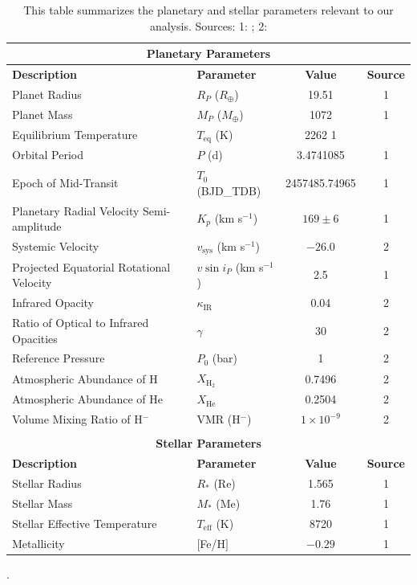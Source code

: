 \documentclass[twocolumn]{aastex631}
\begin{document}
        \begin{table}[ht]
            \centering
            \begin{tabular}{l l c c}
            \hline
            \multicolumn{4}{c}{\textbf{Planetary Parameters}} \\
            \hline
            \textbf{Description} & \textbf{Parameter} & \textbf{Value} & \textbf{Source} \\
            \hline
            Planet Radius & $R_P$ ($R_{\oplus}$) & 19.51 & 1 \\
            Planet Mass & $M_P$ ($M_{\oplus}$) & 1072 & 1 \\
            Equilibrium Temperature & $T_{\text{eq}}$ (K) & 2262 1 \\
            Orbital Period & $P$ (d) & 3.4741085 & 1 \\
            Epoch of Mid-Transit & $T_0$ (BJD\_TDB) & 2457485.74965 & 1 \\
            Planetary Radial Velocity Semi-amplitude & $K_p$ (km s$^{-1}$) & $169 \pm 6$ & 1 \\
            Systemic Velocity & $v_{\text{sys}}$ (km s$^{-1}$) & $-26.0$ & 2 \\
            Projected Equatorial Rotational Velocity & $v \sin i_P$ (km s$^{-1}$) & 2.5 & 1 \\
            Infrared Opacity & $\kappa_{\text{IR}}$ & 0.04 & 2 \\
            Ratio of Optical to Infrared Opacities & $\gamma$ & 30 & 2 \\
            Reference Pressure & $P_0$ (bar) & 1 & 2 \\
            Atmospheric Abundance of H & $X_{\text{H}_2}$ & 0.7496 & 2 \\
            Atmospheric Abundance of He & $X_{\text{He}}$ & 0.2504 & 2 \\
            Volume Mixing Ratio of H$^-$ & VMR (H$^-$) & $1 \times 10^{-9}$ & 2}\\\\
            \hline
            \multicolumn{4}{c}{\textbf{Stellar Parameters}} \\
            \hline
            \textbf{Description} & \textbf{Parameter} & \textbf{Value} & \textbf{Source} \\
            \hline
            Stellar Radius & $R_{\ast}$ (Re) & 1.565 & 1 \\
            Stellar Mass & $M_{\ast}$ (Me) & 1.76 & 1} \\
            Stellar Effective Temperature & $T_{\text{eff}}$ (K) & 8720 & 1 \\
            Metallicity & $[$Fe/H$]$ & $-0.29$ & 1 \\
            \hline
            \end{tabular}
            \caption{This table summarizes the planetary and stellar parameters relevant to our analysis. Sources: 1: \cite{Lund2017}; 2: \cite{Johnson2023}}.
            \label{tab:parameters_summary}
       \end{table}
        
\end{document}
